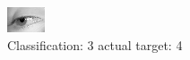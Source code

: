 \begin{figure}[h!]
\begin{center}
\includegraphics[width=0.60\columnwidth]{figures/ID3018_class_3_target_4.png}
\end{center}
\caption{ Classification: 3 actual target: 4}
\label{fig:ID3018_class_3_target_4}
\end{figure}
